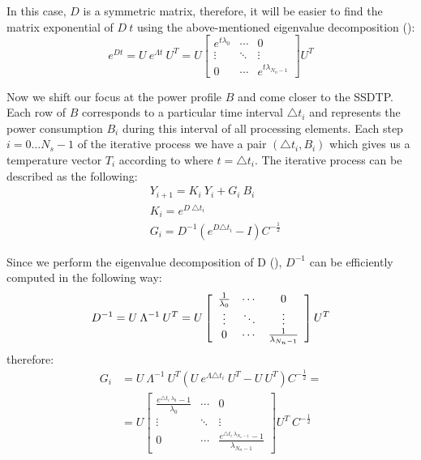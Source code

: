 In this case, $D$ is a symmetric matrix, therefore, it will be easier to find the matrix exponential of $D \: t$ using the above-mentioned eigenvalue decomposition ():
\[
  e^{D t} = U \: e^{\Lambda t} \: U^T = U \left[
      \begin{array}{ccc}
        e^{t \lambda_0} & \cdots & 0 \\
        \vdots & \ddots & \vdots \\
        0 & \cdots & e^{t \lambda_{N_n - 1}}
      \end{array}
    \right] U^T
\]

Now we shift our focus at the power profile $B$ and come closer to the SSDTP. Each row of $B$ corresponds to a particular time interval $\triangle t_i$ and represents the power consumption $B_i$ during this interval of all processing elements. Each step $i = 0 \dots N_s - 1$ of the iterative process we have a pair $(\triangle t_i, B_i)$ which gives us a temperature vector $T_i$ according to  where $t = \triangle t_i$. The iterative process can be described as the following:
\begin{align}
  & Y_{i+1} = K_i \: Y_i + G_i \: B_i \label{eq:recurrent-equation} \\
  & K_i = e^{D \: \triangle t_i} \nonumber \\
  & G_i = D^{-1} \left( e^{D \triangle t_i} - I \right) C^{-\frac{1}{2}} \nonumber
\end{align}

Since we perform the eigenvalue decomposition of D (), $D^{-1}$ can be efficiently computed in the following way:
\[
  D^{-1} = U \: \Lambda^{-1} \: U^T = U \left[
      \begin{array}{ccc}
        \frac{1}{\lambda_0} & \cdots & 0 \\
        \vdots & \ddots & \vdots \\
        0 & \cdots & \frac{1}{\lambda_{N_n - 1}}
      \end{array}
    \right] U^T \\
\]
therefore:
\begin{align*}
  G_i & = U \: \Lambda^{-1} \: U^T \left(U \: e^{\Lambda \triangle t_i} \: U^T - U \: U^T \right) C^{-\frac{1}{2}} = \\
      & = U \left[
        \begin{array}{ccc}
          \frac{e^{\triangle t_i \: \lambda_0} - 1}{\lambda_0} & \cdots & 0 \\
          \vdots & \ddots & \vdots \\
          0 & \cdots & \frac{e^{\triangle t_i \: \lambda_{N_n - 1}} - 1}{\lambda_{N_n - 1}}
        \end{array}
      \right] U^T \: C^{-\frac{1}{2}}
\end{align*}

